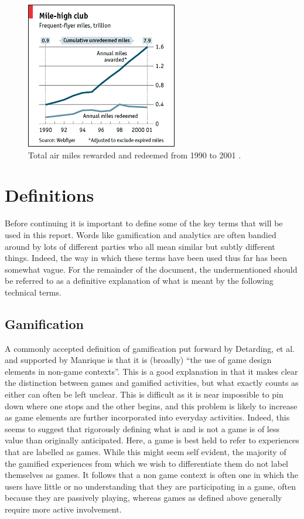 \documentclass[12pt]{article}
\begin{document}
\begin{figure}[p]
	\includegraphics{../img/flyer.png}
	\caption{Total air miles rewarded and redeemed from 1990 to 2001 \cite{freq-fly}.}
	\label{freq-flyer}
\end{figure}

\section{Definitions}
Before continuing it is important to define some of the key terms that will be used in this report. Words like gamification and analytics are often bandied around by lots of different parties who all mean similar but subtly different things. Indeed, the way in which these terms have been used thus far has been somewhat vague. For the remainder of the document, the undermentioned should be referred to as a definitive explanation of what is meant by the following technical terms.

\subsection{Gamification}
A commonly accepted definition of gamification put forward by Detarding, et al. \cite{deterding2011game} and supported by Manrique \cite{iversitymooc} is that it is (broadly) ``the use of game design elements in non-game contexts''. This is a good explanation in that it makes clear the distinction between games and gamified activities, but what exactly counts as either can often be left unclear. This is difficult as it is near impossible to pin down where one stops and the other begins, and this problem is likely to increase as game elements are further incorporated into everyday activities. Indeed, this seems to suggest that rigorously defining what is and is not a game is of less value than originally anticipated. Here, a game is best held to refer to experiences that are labelled as games. While this might seem self evident, the majority of the gamified experiences from which we wish to differentiate them do not label themselves as games. It follows that a non game context is often one in which the users have little or no understanding that they are participating in a game, often because they are passively playing, whereas games as defined above generally require more active involvement.
\end{document}
